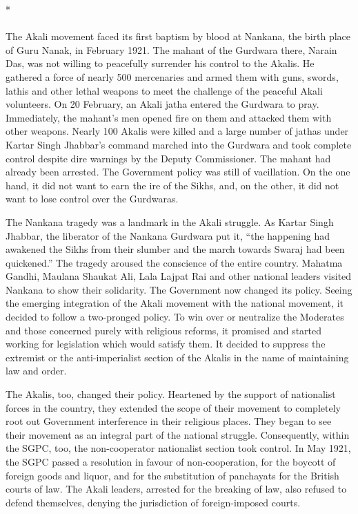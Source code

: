 \begin{multicols}{2}
\begin{center}*\end{center}

\paragraph*{}
The Akali movement faced its first baptism by blood at Nankana, the birth place of Guru Nanak, in February 1921. The mahant of the Gurdwara there, Narain Das, was not willing to peacefully surrender his control to the Akalis. He gathered a force of nearly 500 mercenaries and armed them with guns, swords, lathis and other lethal weapons to meet the challenge of the peaceful Akali volunteers. On 20 February, an Akali jatha entered the Gurdwara to pray. Immediately, the mahant's men opened fire on them and attacked them with other weapons. Nearly 100 Akalis were killed and a large number of jathas under Kartar Singh Jhabbar's command marched into the Gurdwara and took complete control despite dire warnings by the Deputy Commissioner. The mahant had already been arrested. The Government policy was still of vacillation. On the one hand, it did not want to earn the ire of the Sikhs, and, on the other, it did not want to lose control over the Gurdwaras.

The Nankana tragedy was a landmark in the Akali struggle. As Kartar Singh Jhabbar, the liberator of the Nankana Gurdwara put it, ``the happening had awakened the Sikhs from their slumber and the march towards Swaraj had been quickened.'' The tragedy aroused the conscience of the entire country. Mahatma Gandhi, Maulana Shaukat Ali, Lala Lajpat Rai and other national leaders visited Nankana to show their solidarity. The Government now changed its policy. Seeing the emerging integration of the Akali movement with the national movement, it decided to follow a two-pronged policy. To win over or neutralize the Moderates and those concerned purely with religious reforms, it promised and started working for legislation which would satisfy them. It decided to suppress the extremist or the anti-imperialist section of the Akalis in the name of maintaining law and order.

The Akalis, too, changed their policy. Heartened by the support of nationalist forces in the country, they extended the scope of their movement to completely root out Government interference in their religious places. They began to see their movement as an integral part of the national struggle. Consequently, within the SGPC, too, the non-cooperator nationalist section took control. In May 1921, the SGPC passed a resolution in favour of non-cooperation, for the boycott of foreign goods and liquor, and for the substitution of panchayats for the British courts of law. The Akali leaders, arrested for the breaking of law, also refused to defend themselves, denying the jurisdiction of foreign-imposed courts.


\end{multicols}
